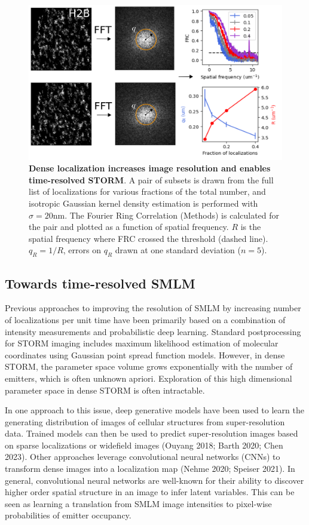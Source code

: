 \documentclass{ucetd}
\begin{document}
\begin{figure}
\begin{center}
\includegraphics[width=13cm]{FRC.png}
\end{center}
\caption{\textbf{Dense localization increases image resolution and enables time-resolved STORM}. A pair of subsets is drawn from the full list of localizations for various fractions of the total number, and isotropic Gaussian kernel density estimation is performed with $\sigma=20\mathrm{nm}$. The Fourier Ring Correlation (Methods) is calculated for the pair and plotted as a function of spatial frequency. $R$ is the spatial frequency where FRC crossed the threshold (dashed line). $q_{R} = 1/R$, errors on $q_{R}$ drawn at one standard deviation ($n=5$). }
\end{figure}


\subsection{Towards time-resolved SMLM}

Previous approaches to improving the resolution of SMLM by increasing number of localizations per unit time have been primarily based on a combination of intensity measurements and probabilistic deep learning. Standard postprocessing for STORM imaging includes maximum likelihood estimation of molecular coordinates using Gaussian point spread function models. However, in dense STORM, the parameter space volume grows exponentially with the number of emitters, which is often unknown apriori. Exploration of this high dimensional parameter space in dense STORM is often intractable. 

In one approach to this issue, deep generative models have been used to learn the generating distribution of images of cellular structures from super-resolution data. Trained models can then be used to predict super-resolution images based on sparse localizations or widefield images (Ouyang 2018; Barth 2020; Chen 2023). Other approaches leverage convolutional neural networks (CNNs) to transform dense images into a localization map (Nehme 2020; Speiser 2021). In general, convolutional neural networks are well-known for their ability to discover higher order spatial structure in an image to infer latent variables. This can be seen as learning a translation from SMLM image intensities to pixel-wise probabilities of emitter occupancy. 
\end{document}
